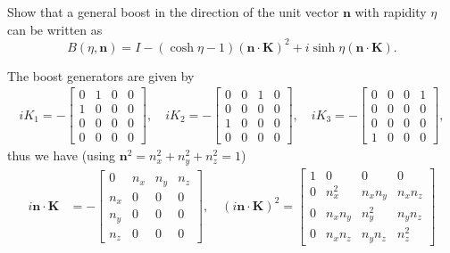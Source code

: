 \documentclass[notes.tex]{subfiles}
\begin{document}
\begin{Exercise}[]
Show that a general boost in the direction of the unit vector $\mathbf n$ with rapidity $\eta$ can be written as
\begin{equation*}
B(\eta,\mathbf n)=I-(\cosh\eta-1)(\mathbf n \cdot \mathbf K)^2+i\sinh\eta (\mathbf n \cdot \mathbf K).
\end{equation*}
\end{Exercise}
\begin{Answer}
The boost generators are given by
\begin{align*}
    iK_1=- \begin{bmatrix}
        0 & 1 & 0 & 0\\
        1 & 0 & 0 & 0\\
        0 & 0 & 0 & 0\\
        0 & 0 & 0 & 0
    \end{bmatrix}, \quad
    iK_2=- \begin{bmatrix}
        0 & 0 & 1 & 0\\
        0 & 0 & 0 & 0\\
        1 & 0 & 0 & 0\\
        0 & 0 & 0 & 0
    \end{bmatrix}, \quad
    iK_3=- \begin{bmatrix}
        0 & 0 & 0 & 1\\
        0 & 0 & 0 & 0\\
        0 & 0 & 0 & 0\\
        1 & 0 & 0 & 0
    \end{bmatrix},
\end{align*}
thus we have (using $\mathbf n^2=n_x^2+n_y^2+n_z^2=1$)
\begin{align*}
    i \mathbf{n}\cdot\mathbf{K} &= -\begin{bmatrix}
        0 & n_x & n_y & n_z \\
        n_x & 0 & 0 & 0 \\
        n_y & 0 & 0 & 0 \\
        n_z & 0 & 0 & 0
    \end{bmatrix}, 
    \quad 
    (i \mathbf{n} \cdot \mathbf{K})^2 = \begin{bmatrix}
        1 & 0 & 0 & 0\\
        0 & n_x^2 & n_xn_y & n_xn_z \\
        0 & n_xn_y & n_y^2 & n_yn_z \\
        0 & n_xn_z & n_yn_z & n_z^2
    \end{bmatrix}
    \\

\end{align*}
\end{Answer}
\end{document}
